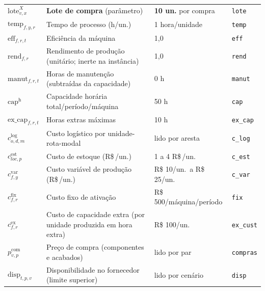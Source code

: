 \documentclass[11pt,a4paper]{article}
\newcommand{\rs}{R\$\,}
\begin{document}
\begin{table}[H]
\begin{tabular}{p{2.4cm}p{6.0cm}p{4.4cm}p{1.6cm}}
$\text{lote}^X_{v,x}$      & \textbf{Lote de compra} (parâmetro)            & \textbf{10 un.} por compra     & \texttt{lote} \\
$\text{temp}_{f,y,r}$      & Tempo de processo (h/un.)                     & 1 hora/unidade                 & \texttt{temp} \\
$\text{eff}_{f,r,t}$       & Eficiência da máquina                          & 1,0                            & \texttt{eff} \\
$\text{rend}_{f,r}$        & Rendimento de produção (unitário; inerte na instância) & 1,0                    & \texttt{rend} \\
$\text{manut}_{f,r,t}$     & Horas de manutenção (subtraídas da capacidade) & 0 h                            & \texttt{manut} \\
$\text{cap}^{\text{h}}$    & Capacidade horária total/período/máquina      & 50 h                           & \texttt{cap} \\
$\text{ex\_cap}_{f,r,t}$   & Horas extras máximas                           & 10 h                           & \texttt{ex\_cap} \\
$c^{\text{log}}_{o,d,m}$   & Custo logístico por unidade-rota-modal         & lido por aresta                & \texttt{c\_log} \\
$c^{\text{est}}_{loc,p}$   & Custo de estoque (\rs/un.)                     & 1 a 4 \rs/un.                  & \texttt{c\_est} \\
$c^{\text{var}}_{f,y}$     & Custo variável de produção (\rs/un.)           & R\$ 10/un.\ a R\$ 25/un.       & \texttt{c\_var} \\
$c^{\text{fix}}_{f,r}$     & Custo fixo de ativação                         & R\$ 500/máquina/período        & \texttt{fix} \\
$c^{\text{ex}}_{f,r}$      & Custo de capacidade extra (por unidade produzida em hora extra) & R\$ 100/un.            & \texttt{ex\_cust} \\
$p^{\text{com}}_{v,p}$     & Preço de compra (componentes e acabados)       & lido por par                   & \texttt{compras} \\
$\text{disp}_{t,p,v}$      & Disponibilidade no fornecedor (limite superior) & lido por cenário              & \texttt{disp} \\
\bottomrule
\end{tabular}
\end{table}
\end{document}
